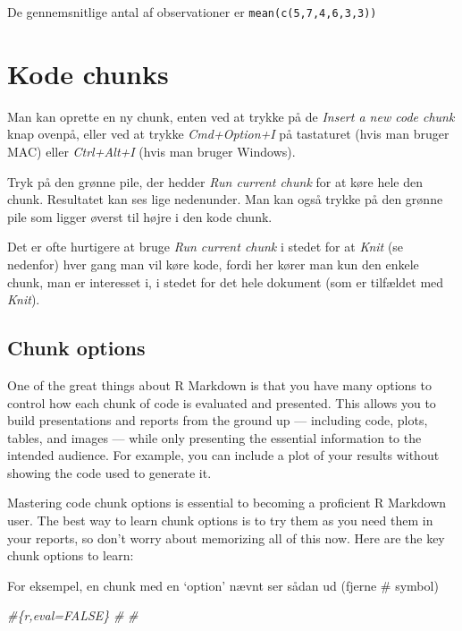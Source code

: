 \documentclass[
]{book}
\newenvironment{Shaded}{\begin{snugshade}}{\end{snugshade}}
\newcommand{\CommentTok}[1]{\textcolor[rgb]{0.56,0.35,0.01}{\textit{#1}}}
\begin{document}
De gennemsnitlige antal af observationer er \texttt{mean(c(5,7,4,6,3,3))}

\hypertarget{kode-chunks}{%
\section{Kode chunks}\label{kode-chunks}}

Man kan oprette en ny chunk, enten ved at trykke på de \emph{Insert a new code chunk} knap ovenpå, eller ved at trykke \emph{Cmd+Option+I} på tastaturet (hvis man bruger MAC) eller \emph{Ctrl+Alt+I} (hvis man bruger Windows).

Tryk på den grønne pile, der hedder \emph{Run current chunk} for at køre hele den chunk. Resultatet kan ses lige nedenunder. Man kan også trykke på den grønne pile som ligger øverst til højre i den kode chunk.

Det er ofte hurtigere at bruge \emph{Run current chunk} i stedet for at \emph{Knit} (se nedenfor) hver gang man vil køre kode, fordi her kører man kun den enkele chunk, man er interesset i, i stedet for det hele dokument (som er tilfældet med \emph{Knit}).

\hypertarget{chunk-options}{%
\subsection{Chunk options}\label{chunk-options}}

One of the great things about R Markdown is that you have many options to control how each chunk of code is evaluated and presented. This allows you to build presentations and reports from the ground up --- including code, plots, tables, and images --- while only presenting the essential information to the intended audience. For example, you can include a plot of your results without showing the code used to generate it.

Mastering code chunk options is essential to becoming a proficient R Markdown user. The best way to learn chunk options is to try them as you need them in your reports, so don't worry about memorizing all of this now. Here are the key chunk options to learn:

For eksempel, en chunk med en `option' nævnt ser sådan ud (fjerne \# symbol)

\begin{Shaded}
\begin{Highlighting}[]
\CommentTok{\#\textasciigrave{}\textasciigrave{}\textasciigrave{}\{r,eval=FALSE\}}
\CommentTok{\#}
\CommentTok{\#\textasciigrave{}\textasciigrave{}\textasciigrave{}}
\end{Highlighting}
\end{Shaded}
\end{document}

